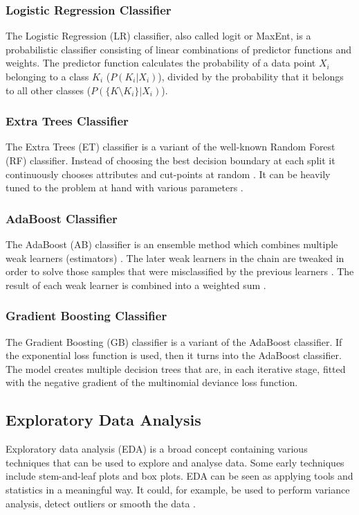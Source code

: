 \subsubsection{Logistic Regression Classifier}
The Logistic Regression (LR) classifier, also called logit or MaxEnt, is a probabilistic classifier consisting of linear combinations of predictor functions and weights.
The predictor function calculates the probability of a data point $X_i$ belonging to a class $K_i$ ($P(K_i|X_i)$), divided by the probability that it belongs to all other classes ($P(\{K \setminus K_i\} | X_i)$).

\subsubsection{Extra Trees Classifier}
The Extra Trees (ET) classifier is a variant of the well-known Random Forest (RF) classifier.
Instead of choosing the best decision boundary at each split it continuously chooses attributes and cut-points at random \cite{Geurts2006}.
It can be heavily tuned to the problem at hand with various parameters \cite{Geurts2006}.

\subsubsection{AdaBoost Classifier}
The AdaBoost (AB) classifier is an ensemble method which combines multiple weak learners (estimators) \cite{Freund1995}.
The later weak learners in the chain are tweaked in order to solve those samples that were misclassified by the previous learners \cite{Freund1995}.
The result of each weak learner is combined into a weighted sum \cite{Freund1995}.

\subsubsection{Gradient Boosting Classifier}
The Gradient Boosting (GB) classifier is a variant of the AdaBoost classifier.
If the exponential loss function is used, then it turns into the AdaBoost classifier.
The model creates multiple decision trees that are, in each iterative stage, fitted with the negative gradient of the multinomial deviance loss function.

\subsection{Exploratory Data Analysis}
Exploratory data analysis (EDA) is a broad concept containing various techniques \cite{Hoaglin2003, Tukey1977, Velleman1981} that can be used to explore and analyse data.
Some early techniques include stem-and-leaf plots and box plots.
EDA can be seen as applying tools and statistics in a meaningful way.
It could, for example, be used to perform variance analysis, detect outliers or smooth the data \cite{Hoaglin2003, Tukey1977, Velleman1981}.

